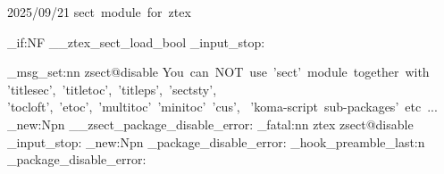   {2025/09/21}{\ztex@versi@n}
  {sect~module~for~ztex}




\bool_if:NF \g__ztex_sect_load_bool 
  { \file_input_stop: }


\ztex_msg_set:nn { zsect@disable }
  {
    You~can~NOT~use~'sect'~module~together~with~
    'titlesec',~'titletoc',~'titleps',~'sectsty',~
    'tocloft',~'etoc',~'multitoc'~'minitoc'~'cus',~
    'koma-script~sub-packages'~etc~...
  }
\cs_new:Npn \__zsect_package_disable_error:
  {
    \msg_fatal:nn { ztex } { zsect@disable }
    \file_input_stop:
  }
\cs_new:Npn \zsect_package_disable_error:
  {
  }
\ztex_hook_preamble_last:n 
  {
    \zsect_package_disable_error:
  }



